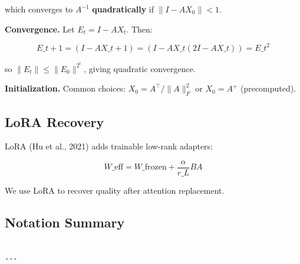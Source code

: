 which converges to $A^{-1}$ \textbf{quadratically} if $\|I - A X_0\| < 1$.

\textbf{Convergence.} Let $E_t = I - A X_t$. Then:

\[
E\_{t+1} = (I - A X\_{t+1}) = (I - A X\_t (2I - A X\_t)) = E\_t^2
\]

so $\|E_t\| \le \|E_0\|^{2^t}$, giving quadratic convergence.

\textbf{Initialization.} Common choices: $X_0 = A^\top / \|A\|_F^2$ or $X_0 = A^+$ 
(precomputed).

\subsection{LoRA Recovery}

LoRA (Hu et al., 2021) adds trainable low-rank adapters:

\[
W\_\text{eff} = W\_\text{frozen} + \frac{\alpha}{r\_L} B A
\]

We use LoRA to recover quality after attention replacement.

\subsection{Notation Summary}

\begin{lstlisting}

---
\end{lstlisting}